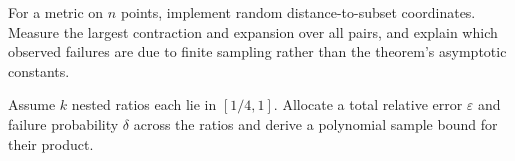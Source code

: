 \begin{problem}
For a metric on $n$ points, implement random distance-to-subset coordinates.
Measure the largest contraction and expansion over all pairs, and explain
which observed failures are due to finite sampling rather than the theorem's
asymptotic constants.
\end{problem}

\begin{problem}
Assume $k$ nested ratios each lie in $[1/4,1]$.  Allocate a total relative
error $\varepsilon$ and failure probability $\delta$ across the ratios and
derive a polynomial sample bound for their product.
\end{problem}
